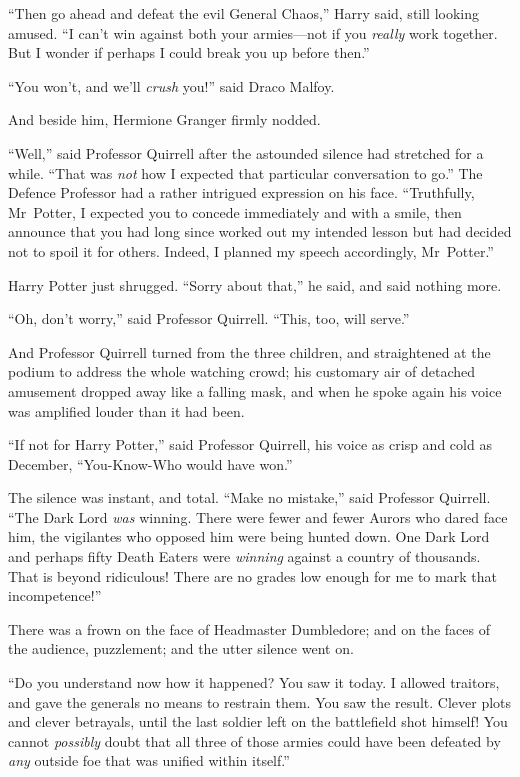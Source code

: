 “Then go ahead and defeat the evil General Chaos,” Harry said, still looking
amused. “I can’t win against both your armies—not if you \emph{really} work
together. But I wonder if perhaps I could break you up before then.”

“You won’t, and we’ll \emph{crush} you!” said Draco Malfoy.

And beside him, Hermione Granger firmly nodded.

“Well,” said Professor Quirrell after the astounded silence had stretched for a
while. “That was \emph{not} how I expected that particular conversation to go.”
The Defence Professor had a rather intrigued expression on his face.
“Truthfully, Mr~Potter, I expected you to concede immediately and with a
smile, then announce that you had long since worked out my intended lesson but
had decided not to spoil it for others. Indeed, I planned my speech
accordingly, Mr~Potter.”

Harry Potter just shrugged. “Sorry about that,” he said, and said nothing more.

“Oh, don’t worry,” said Professor Quirrell. “This, too, will serve.”

And Professor Quirrell turned from the three children, and straightened at the
podium to address the whole watching crowd; his customary air of detached
amusement dropped away like a falling mask, and when he spoke again his voice
was amplified louder than it had been.

“If not for Harry Potter,” said Professor Quirrell, his voice as crisp and cold
as December, “You-Know-Who would have won.”

The silence was instant, and total.
\later
“Make no mistake,” said Professor Quirrell. “The Dark Lord \emph{was} winning.
There were fewer and fewer Aurors who dared face him, the vigilantes who
opposed him were being hunted down. One Dark Lord and perhaps fifty Death
Eaters were \emph{winning} against a country of thousands. That is beyond
ridiculous! There are no grades low enough for me to mark that incompetence!”

There was a frown on the face of Headmaster Dumbledore; and on the faces of the
audience, puzzlement; and the utter silence went on.

“Do you understand now how it happened? You saw it today. I allowed traitors,
and gave the generals no means to restrain them. You saw the result. Clever
plots and clever betrayals, until the last soldier left on the battlefield shot
himself! You cannot \emph{possibly} doubt that all three of those armies could
have been defeated by \emph{any} outside foe that was unified within itself.”

